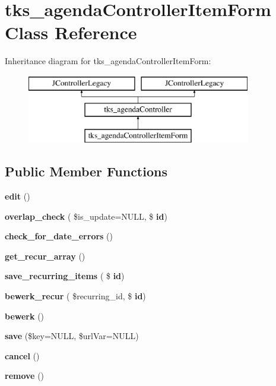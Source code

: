 \section{tks\+\_\+agenda\+Controller\+Item\+Form Class Reference}
\label{classtks__agenda_controller_item_form}
Inheritance diagram for tks\+\_\+agenda\+Controller\+Item\+Form\+:\begin{figure}[H]
\begin{center}
\leavevmode
\includegraphics[height=3.000000cm]{classtks__agenda_controller_item_form}
\end{center}
\end{figure}
\subsection*{Public Member Functions}
\begin{DoxyCompactItemize}
\item 
\textbf{ edit} ()
\item 
\textbf{ overlap\+\_\+check} ( \$is\+\_\+update=N\+U\+LL, \$\textbf{ id})
\item 
\textbf{ check\+\_\+for\+\_\+date\+\_\+errors} ()
\item 
\textbf{ get\+\_\+recur\+\_\+array} ()
\item 
\textbf{ save\+\_\+recurring\+\_\+items} ( \$\textbf{ id})
\item 
\textbf{ bewerk\+\_\+recur} ( \$recurring\+\_\+id, \$\textbf{ id})
\item 
\textbf{ bewerk} ()
\item 
\textbf{ save} (\$key=N\+U\+LL, \$url\+Var=N\+U\+LL)
\item 
\textbf{ cancel} ()
\item 
\textbf{ remove} ()
\end{DoxyCompactItemize}
